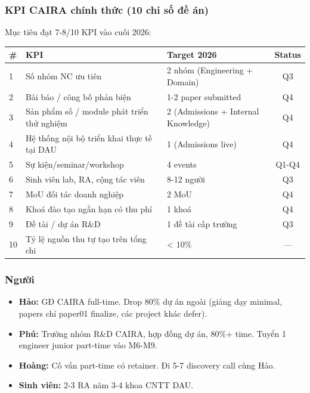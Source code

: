 \documentclass[11pt,a4paper]{article}
\begin{document}
\subsubsection*{KPI CAIRA chính thức (10 chỉ số đề án)}

Mục tiêu đạt 7-8/10 KPI vào cuối 2026:

\begin{tabularx}{\linewidth}{@{}p{0.4cm} X p{2.5cm} c@{}}
\toprule
\textbf{\#} & \textbf{KPI} & \textbf{Target 2026} & \textbf{Status} \\
\midrule
1 & Số nhóm NC ưu tiên & 2 nhóm (Engineering + Domain) & Q3 \\
2 & Bài báo / công bố phản biện & 1-2 paper submitted & Q4 \\
3 & Sản phẩm số / module phát triển thử nghiệm & 2 (Admissions + Internal Knowledge) & Q4 \\
4 & Hệ thống nội bộ triển khai thực tế tại DAU & 1 (Admissions live) & Q4 \\
5 & Sự kiện/seminar/workshop & 4 events & Q1-Q4 \\
6 & Sinh viên lab, RA, cộng tác viên & 8-12 người & Q3 \\
7 & MoU đối tác doanh nghiệp & 2 MoU & Q4 \\
8 & Khoá đào tạo ngắn hạn có thu phí & 1 khoá & Q4 \\
9 & Đề tài / dự án R\&D & 1 đề tài cấp trường & Q3 \\
10 & Tỷ lệ nguồn thu tự tạo trên tổng chi & < 10\% & --- \\
\bottomrule
\end{tabularx}

\subsubsection*{Người}

\begin{itemize}
\item \textbf{Hảo:} GĐ CAIRA full-time. Drop 80\% dự án ngoài (giảng dạy minimal, papers chỉ paper01 finalize, các project khác defer).
\item \textbf{Phú:} Trưởng nhóm R\&D CAIRA, hợp đồng dự án, 80\%+ time. Tuyển 1 engineer junior part-time vào M6-M9.
\item \textbf{Hoàng:} Cố vấn part-time có retainer. Đi 5-7 discovery call cùng Hảo.
\item \textbf{Sinh viên:} 2-3 RA năm 3-4 khoa CNTT DAU.
\end{itemize}
\end{document}
